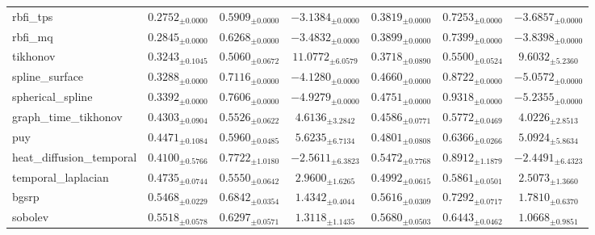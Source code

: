 \begin{table}[ht]
\begin{tabular}{lcccccc}
rbfi\_tps & $0.2752_{\pm 0.0000}$ & $0.5909_{\pm 0.0000}$ & $-3.1384_{\pm 0.0000}$ & $0.3819_{\pm 0.0000}$ & $0.7253_{\pm 0.0000}$ & $-3.6857_{\pm 0.0000}$ \\
rbfi\_mq & $0.2845_{\pm 0.0000}$ & $0.6268_{\pm 0.0000}$ & $-3.4832_{\pm 0.0000}$ & $0.3899_{\pm 0.0000}$ & $0.7399_{\pm 0.0000}$ & $-3.8398_{\pm 0.0000}$ \\
tikhonov & $0.3243_{\pm 0.1045}$ & $0.5060_{\pm 0.0672}$ & $11.0772_{\pm 6.0579}$ & $0.3718_{\pm 0.0890}$ & $0.5500_{\pm 0.0524}$ & $9.6032_{\pm 5.2360}$ \\
spline\_surface & $0.3288_{\pm 0.0000}$ & $0.7116_{\pm 0.0000}$ & $-4.1280_{\pm 0.0000}$ & $0.4660_{\pm 0.0000}$ & $0.8722_{\pm 0.0000}$ & $-5.0572_{\pm 0.0000}$ \\
spherical\_spline & $0.3392_{\pm 0.0000}$ & $0.7606_{\pm 0.0000}$ & $-4.9279_{\pm 0.0000}$ & $0.4751_{\pm 0.0000}$ & $0.9318_{\pm 0.0000}$ & $-5.2355_{\pm 0.0000}$ \\
graph\_time\_tikhonov & $0.4303_{\pm 0.0904}$ & $0.5526_{\pm 0.0622}$ & $4.6136_{\pm 3.2842}$ & $0.4586_{\pm 0.0771}$ & $0.5772_{\pm 0.0469}$ & $4.0226_{\pm 2.8513}$ \\
puy & $0.4471_{\pm 0.1084}$ & $0.5960_{\pm 0.0485}$ & $5.6235_{\pm 6.7134}$ & $0.4801_{\pm 0.0808}$ & $0.6366_{\pm 0.0266}$ & $5.0924_{\pm 5.8634}$ \\
heat\_diffusion\_temporal & $0.4100_{\pm 0.5766}$ & $0.7722_{\pm 1.0180}$ & $-2.5611_{\pm 6.3823}$ & $0.5472_{\pm 0.7768}$ & $0.8912_{\pm 1.1879}$ & $-2.4491_{\pm 6.4323}$ \\
temporal\_laplacian & $0.4735_{\pm 0.0744}$ & $0.5550_{\pm 0.0642}$ & $2.9600_{\pm 1.6265}$ & $0.4992_{\pm 0.0615}$ & $0.5861_{\pm 0.0501}$ & $2.5073_{\pm 1.3660}$ \\
bgsrp & $0.5468_{\pm 0.0229}$ & $0.6842_{\pm 0.0354}$ & $1.4342_{\pm 0.4044}$ & $0.5616_{\pm 0.0309}$ & $0.7292_{\pm 0.0717}$ & $1.7810_{\pm 0.6370}$ \\
sobolev & $0.5518_{\pm 0.0578}$ & $0.6297_{\pm 0.0571}$ & $1.3118_{\pm 1.1435}$ & $0.5680_{\pm 0.0503}$ & $0.6443_{\pm 0.0462}$ & $1.0668_{\pm 0.9851}$ \\
\bottomrule
\end{tabular}
\end{table}







